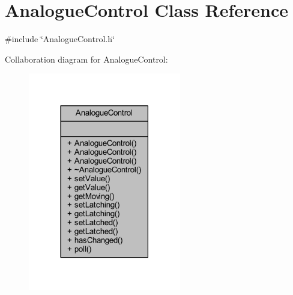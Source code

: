 \hypertarget{class_analogue_control}{}\section{Analogue\+Control Class Reference}
\label{class_analogue_control}


{\ttfamily \#include \char`\"{}Analogue\+Control.\+h\char`\"{}}



Collaboration diagram for Analogue\+Control\+:
\nopagebreak
\begin{figure}[H]
\begin{center}
\leavevmode
\includegraphics[width=189pt]{de/da0/class_analogue_control__coll__graph}
\end{center}
\end{figure}

